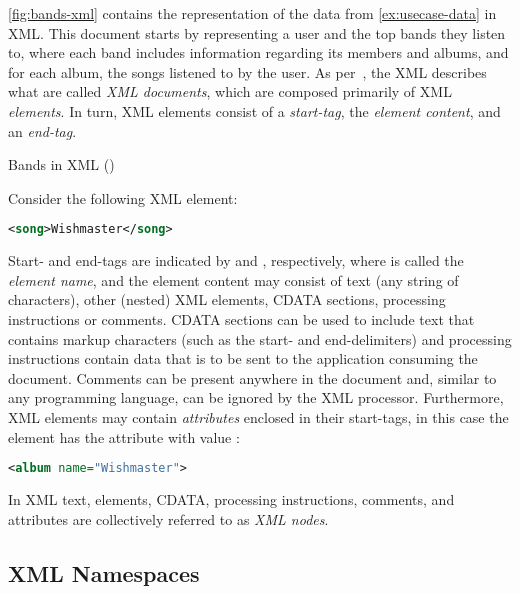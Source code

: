 \cref{fig:bands-xml} contains the representation of the \usecase data from \cref{ex:usecase-data} in \ac{XML}.  This
document starts by representing a user and the top bands they listen to, where each band includes information regarding
its members and albums, and for each album, the songs listened to by the user.
%
As per~\citet{BrayPaoliSperberg-Mcqueen:2008aa}, the \acl{XML} describes what are called \emph{\ac{XML} documents},
which are composed primarily of \ac{XML} \emph{elements}.
%
In turn, \ac{XML} elements consist of a \emph{start-tag}, the \emph{element content}, and an \emph{end-tag}. 
%
\begin{data}[t]
  \centering
  
  \caption{Bands in XML ()}
\label{fig:bands-xml}
\end{data}
%
Consider the following \ac{XML} element: 
%
\begin{lstlisting}[language=XML,basicstyle=\small\ttfamily,frame=none,numbers=none]
<song>Wishmaster</song>
\end{lstlisting}
%
Start- and end-tags are indicated by  and , respectively, where
 is called the \emph{element name}, and the element content may consist of text (any string of
characters), other (nested) \ac{XML} elements, CDATA sections, processing instructions or comments.
%
CDATA sections can be used to include text that contains markup characters (such as the start- and end-delimiters) and
processing instructions contain data that is to be sent to the application consuming the document.
%
Comments can be present anywhere in the document and, similar to any programming language, can be ignored by the
\ac{XML} processor.
%
Furthermore, \ac{XML} elements may contain \emph{attributes} enclosed in their start-tags, in this case the
 element has the  attribute with value :
%
\begin{lstlisting}[language=XML,basicstyle=\small\ttfamily,frame=none,numbers=none]
<album name="Wishmaster">
\end{lstlisting}
%
In \ac{XML} text, elements, CDATA, processing instructions, comments, and attributes are collectively referred to as
\emph{\ac{XML} nodes}.

\subsection{XML Namespaces}
\label{sec:xml-namespaces}

